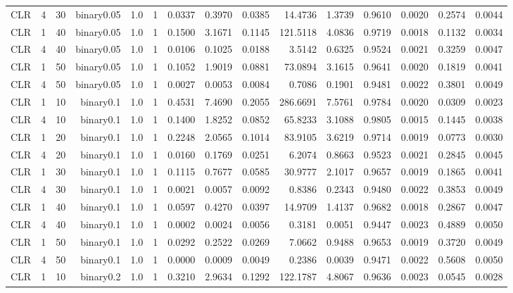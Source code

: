 \begin{longtable}{rrrrrrrrrrrrrrr}
  CLR & 4 & 30 & binary0.05 & 1.0 & 1 & 0.0337 & 0.3970 & 0.0385 & 14.4736 & 1.3739 & 0.9610 & 0.0020 & 0.2574 & 0.0044 \\ 
  CLR & 1 & 40 & binary0.05 & 1.0 & 1 & 0.1500 & 3.1671 & 0.1145 & 121.5118 & 4.0836 & 0.9719 & 0.0018 & 0.1132 & 0.0034 \\ 
  CLR & 4 & 40 & binary0.05 & 1.0 & 1 & 0.0106 & 0.1025 & 0.0188 & 3.5142 & 0.6325 & 0.9524 & 0.0021 & 0.3259 & 0.0047 \\ 
  CLR & 1 & 50 & binary0.05 & 1.0 & 1 & 0.1052 & 1.9019 & 0.0881 & 73.0894 & 3.1615 & 0.9641 & 0.0020 & 0.1819 & 0.0041 \\ 
  CLR & 4 & 50 & binary0.05 & 1.0 & 1 & 0.0027 & 0.0053 & 0.0084 & 0.7086 & 0.1901 & 0.9481 & 0.0022 & 0.3801 & 0.0049 \\ 
  CLR & 1 & 10 & binary0.1 & 1.0 & 1 & 0.4531 & 7.4690 & 0.2055 & 286.6691 & 7.5761 & 0.9784 & 0.0020 & 0.0309 & 0.0023 \\ 
  CLR & 4 & 10 & binary0.1 & 1.0 & 1 & 0.1400 & 1.8252 & 0.0852 & 65.8233 & 3.1088 & 0.9805 & 0.0015 & 0.1445 & 0.0038 \\ 
  CLR & 1 & 20 & binary0.1 & 1.0 & 1 & 0.2248 & 2.0565 & 0.1014 & 83.9105 & 3.6219 & 0.9714 & 0.0019 & 0.0773 & 0.0030 \\ 
  CLR & 4 & 20 & binary0.1 & 1.0 & 1 & 0.0160 & 0.1769 & 0.0251 & 6.2074 & 0.8663 & 0.9523 & 0.0021 & 0.2845 & 0.0045 \\ 
  CLR & 1 & 30 & binary0.1 & 1.0 & 1 & 0.1115 & 0.7677 & 0.0585 & 30.9777 & 2.1017 & 0.9657 & 0.0019 & 0.1865 & 0.0041 \\ 
  CLR & 4 & 30 & binary0.1 & 1.0 & 1 & 0.0021 & 0.0057 & 0.0092 & 0.8386 & 0.2343 & 0.9480 & 0.0022 & 0.3853 & 0.0049 \\ 
  CLR & 1 & 40 & binary0.1 & 1.0 & 1 & 0.0597 & 0.4270 & 0.0397 & 14.9709 & 1.4137 & 0.9682 & 0.0018 & 0.2867 & 0.0047 \\ 
  CLR & 4 & 40 & binary0.1 & 1.0 & 1 & 0.0002 & 0.0024 & 0.0056 & 0.3181 & 0.0051 & 0.9447 & 0.0023 & 0.4889 & 0.0050 \\ 
  CLR & 1 & 50 & binary0.1 & 1.0 & 1 & 0.0292 & 0.2522 & 0.0269 & 7.0662 & 0.9488 & 0.9653 & 0.0019 & 0.3720 & 0.0049 \\ 
  CLR & 4 & 50 & binary0.1 & 1.0 & 1 & 0.0000 & 0.0009 & 0.0049 & 0.2386 & 0.0039 & 0.9471 & 0.0022 & 0.5608 & 0.0050 \\ 
  CLR & 1 & 10 & binary0.2 & 1.0 & 1 & 0.3210 & 2.9634 & 0.1292 & 122.1787 & 4.8067 & 0.9636 & 0.0023 & 0.0545 & 0.0028 \\ 

\end{longtable}
